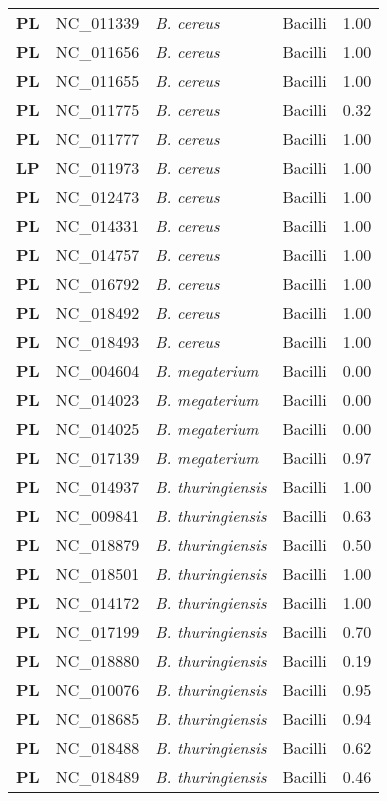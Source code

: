 \begin{adjustwidth}{-3cm}{2cm}
{\begin{supertabular}{>{\bfseries}l|p{0.1\textwidth}p{0.14\textwidth}l|l}
PL & NC\_011339 & \textit{B. cereus} & Bacilli & 1.00\\
PL & NC\_011656 & \textit{B. cereus} & Bacilli & 1.00\\
PL & NC\_011655 & \textit{B. cereus} & Bacilli & 1.00\\
PL & NC\_011775 & \textit{B. cereus} & Bacilli & 0.32\\
PL & NC\_011777 & \textit{B. cereus} & Bacilli & 1.00\\
LP & NC\_011973 & \textit{B. cereus} & Bacilli & 1.00\\
PL & NC\_012473 & \textit{B. cereus} & Bacilli & 1.00\\
PL & NC\_014331 & \textit{B. cereus} & Bacilli & 1.00\\
PL & NC\_014757 & \textit{B. cereus} & Bacilli & 1.00\\
PL & NC\_016792 & \textit{B. cereus} & Bacilli & 1.00\\
PL & NC\_018492 & \textit{B. cereus} & Bacilli & 1.00\\
PL & NC\_018493 & \textit{B. cereus} & Bacilli & 1.00\\
PL & NC\_004604 & \textit{B. megaterium} & Bacilli & 0.00\\
PL & NC\_014023 & \textit{B. megaterium} & Bacilli & 0.00\\
PL & NC\_014025 & \textit{B. megaterium} & Bacilli & 0.00\\
PL & NC\_017139 & \textit{B. megaterium} & Bacilli & 0.97\\
PL & NC\_014937 & \textit{B. thuringiensis} & Bacilli & 1.00\\
PL & NC\_009841 & \textit{B. thuringiensis} & Bacilli & 0.63\\
PL & NC\_018879 & \textit{B. thuringiensis} & Bacilli & 0.50\\
PL & NC\_018501 & \textit{B. thuringiensis} & Bacilli & 1.00\\
PL & NC\_014172 & \textit{B. thuringiensis} & Bacilli & 1.00\\
PL & NC\_017199 & \textit{B. thuringiensis} & Bacilli & 0.70\\
PL & NC\_018880 & \textit{B. thuringiensis} & Bacilli & 0.19\\
PL & NC\_010076 & \textit{B. thuringiensis} & Bacilli & 0.95\\
PL & NC\_018685 & \textit{B. thuringiensis} & Bacilli & 0.94\\
PL & NC\_018488 & \textit{B. thuringiensis} & Bacilli & 0.62\\
PL & NC\_018489 & \textit{B. thuringiensis} & Bacilli & 0.46\\

\end{supertabular}}
\end{adjustwidth}
